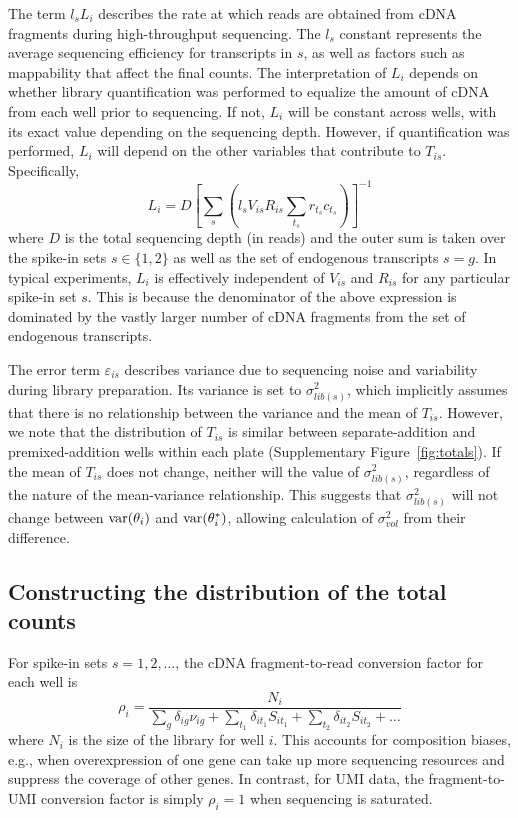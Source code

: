 \documentclass{article}
\begin{document}
The term $l_s L_i$ describes the rate at which reads are obtained from cDNA fragments during high-throughput sequencing.
The $l_s$ constant represents the average sequencing efficiency for transcripts in $s$, as well as factors such as mappability that affect the final counts.
The interpretation of $L_i$ depends on whether library quantification was performed to equalize the amount of cDNA from each well prior to sequencing.
If not, $L_i$ will be constant across wells, with its exact value depending on the sequencing depth.
However, if quantification was performed, $L_i$ will depend on the other variables that contribute to $T_{is}$.
Specifically,
\[
    L_i = D \left[ \sum_{s} \left( l_s V_{is} R_{is} \sum_{t_s} r_{t_s} c_{t_s} \right) \right]^{-1}
\]
where $D$ is the total sequencing depth (in reads) and the outer sum is taken over the spike-in sets $s\in \{1, 2\}$ as well as the set of endogenous transcripts $s=g$.
In typical experiments, $L_i$ is effectively independent of $V_{is}$ and $R_{is}$ for any particular spike-in set $s$.
This is because the denominator of the above expression is dominated by the vastly larger number of cDNA fragments from the set of endogenous transcripts.

The error term $\varepsilon_{is}$ describes variance due to sequencing noise and variability during library preparation.
Its variance is set to $\sigma^2_{lib(s)}$, which implicitly assumes that there is no relationship between the variance and the mean of $T_{is}$.
However, we note that the distribution of $T_{is}$ is similar between separate-addition and premixed-addition wells within each plate (Supplementary Figure~\ref{fig:totals}).
If the mean of $T_{is}$ does not change, neither will the value of $\sigma^2_{lib(s)}$, regardless of the nature of the mean-variance relationship. 
This suggests that $\sigma^2_{lib(s)}$ will not change between $\mbox{var}(\theta_i)$ and $\mbox{var}(\theta^*_i)$, allowing calculation of $\sigma^2_{vol}$ from their difference.

\subsection{Constructing the distribution of the total counts}
For spike-in sets $s=1, 2, \ldots$, the cDNA fragment-to-read conversion factor for each well is
\[
    \rho_i = \frac{N_i}{\sum_g \delta_{ig}\nu_{ig} + \sum_{t_1} \delta_{it_1} S_{it_1}  + \sum_{t_2} \delta_{it_2} S_{it_2} + \ldots} 
\]
where $N_i$ is the size of the library for well $i$.
This accounts for composition biases, e.g., when overexpression of one gene can take up more sequencing resources and suppress the coverage of other genes.
In contrast, for UMI data, the fragment-to-UMI conversion factor is simply $\rho_i = 1$ when sequencing is saturated.
\end{document}
